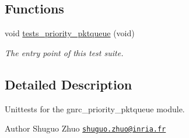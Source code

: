 \subsection*{Functions}
\begin{DoxyCompactItemize}
\item 
void \hyperlink{group__unittests_gab6133c9a0e70affe6b5a5267478e6d9d}{tests\+\_\+priority\+\_\+pktqueue} (void)
\begin{DoxyCompactList}\small\item\em The entry point of this test suite. \end{DoxyCompactList}\end{DoxyCompactItemize}


\subsection{Detailed Description}
Unittests for the {\ttfamily gnrc\+\_\+priority\+\_\+pktqueue} module. 

\begin{DoxyAuthor}{Author}
Shuguo Zhuo \href{mailto:shuguo.zhuo@inria.fr}{\tt shuguo.\+zhuo@inria.\+fr} 
\end{DoxyAuthor}
